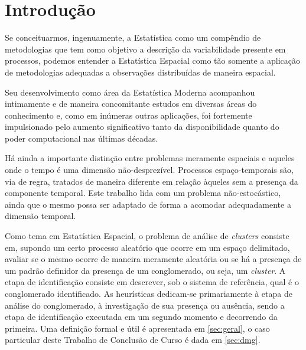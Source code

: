\documentclass[
	12pt,				%
	openright,			%
	twoside,			%
	a4paper,			%
	english,			%
	french,				%
	spanish,			%
	brazil				%
	]{abntex2}
\begin{document}
\tableofcontents*
\cleardoublepage



\textual

\chapter*[Introdução]{Introdução}


Se conceituarmos, ingenuamente, a Estatística como um compêndio de metodologias que tem como objetivo a descrição da variabilidade presente em processos, podemos entender a Estatística Espacial como tão somente a aplicação de metodologias adequadas a observações distribuídas de maneira espacial. 

Seu desenvolvimento como área da Estatística Moderna acompanhou intimamente e de maneira concomitante estudos em diversas áreas do conhecimento e, como em inúmeras outras aplicações, foi fortemente impulsionado pelo aumento significativo tanto da disponibilidade quanto do poder computacional nas últimas décadas. 

Há ainda a importante distinção entre problemas meramente espaciais e aqueles onde o tempo é uma dimensão não-desprezível. Processos espaço-temporais são, via de regra, tratados de maneira diferente em relação àqueles sem a presença da componente temporal. Este trabalho lida com um problema não-estocástico, ainda que o mesmo possa ser adaptado de forma a acomodar adequadamente a dimensão temporal.

Como tema em Estatística Espacial, o problema de análise de \textit{clusters} consiste em, supondo um certo processo aleatório que ocorre em um espaço delimitado, avaliar se o mesmo ocorre de maneira meramente aleatória ou se há a presença de um padrão definidor da presença de um conglomerado, ou seja, um \textit{cluster}. A etapa de identificação consiste em descrever, sob o sistema de referência, qual é o conglomerado identificado. As heurísticas dedicam-se primariamente à etapa de análise do conglomerado, à investigação de sua presença ou ausência, sendo a etapa de identificação executada em um segundo momento e decorrendo da primeira. Uma definição formal e útil é apresentada em \ref{sec:geral}, o caso particular deste Trabalho de Conclusão de Curso é dada em \ref{sec:dmg}.
\end{document}
